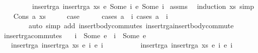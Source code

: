 \begin{isabellebody}
\ \ \ \ \ \ \ \ \ insert{\isacharunderscore}rga\ {\isacharparenleft}insert{\isacharunderscore}rga\ xs\ {\isacharparenleft}e{}{\isacharcomma}\ Some\ i{}{\isacharparenright}{\isacharparenright}\ {\isacharparenleft}e{}{\isacharcomma}\ Some\ i{}{\isacharparenright}{\isachardoublequoteclose}\isanewline
%
\isadelimproof
%
\endisadelimproof
%
\isatagproof
{}\isamarkupfalse%
\ assms\ \isamarkupfalse%
\ {\isacharparenleft}induction\ xs{\isacharcomma}\ simp{\isacharparenright}\isanewline
\ \ \isamarkupfalse%
\ {\isacharparenleft}Cons\ a\ xs{\isacharparenright}\isanewline
\ \ \isamarkupfalse%
\ \isamarkupfalse%
\ {\isacharquery}case\isanewline
\ \ \ \ \isamarkupfalse%
\ {\isacharparenleft}cases\ {\isachardoublequoteopen}a\ {\isacharequal}\ i{}{\isachardoublequoteclose}{\isacharsemicolon}\ cases\ {\isachardoublequoteopen}a\ {\isacharequal}\ i{}{\isachardoublequoteclose}{\isacharsemicolon}\isanewline
\ \ \ \ \ \ \ \ auto\ simp\ add{\isacharcolon}\ insert{\isacharunderscore}body{\isacharunderscore}commutes\ insert{\isacharunderscore}rga{\isacharunderscore}insert{\isacharunderscore}body{\isacharunderscore}commute{\isacharparenright}\isanewline
{}\isamarkupfalse%
%
\endisatagproof
{\isafoldproof}%
%
\isadelimproof
\isanewline
%
\endisadelimproof
\isanewline
{}\isamarkupfalse%
\ insert{\isacharunderscore}rga{\isacharunderscore}commutes{\isacharcolon}\isanewline
\ \ \ {\isachardoublequoteopen}i{}\ {\isasymnoteq}\ Some\ e{}{\isachardoublequoteclose}\ \ {\isachardoublequoteopen}i{}\ {\isasymnoteq}\ Some\ e{}{\isachardoublequoteclose}\isanewline
\ \ \ {\isachardoublequoteopen}insert{\isacharunderscore}rga\ {\isacharparenleft}insert{\isacharunderscore}rga\ xs\ {\isacharparenleft}e{}{\isacharcomma}\ i{}{\isacharparenright}{\isacharparenright}\ {\isacharparenleft}e{}{\isacharcomma}\ i{}{\isacharparenright}\ {\isacharequal}\isanewline
\ \ \ \ \ \ \ \ \ insert{\isacharunderscore}rga\ {\isacharparenleft}insert{\isacharunderscore}rga\ xs\ {\isacharparenleft}e{}{\isacharcomma}\ i{}{\isacharparenright}{\isacharparenright}\ {\isacharparenleft}e{}{\isacharcomma}\ i{}{\isacharparenright}{\isachardoublequoteclose}\isanewline
%
\isadelimproof
%
\endisadelimproof
%
\isatagproof
{}\isamarkupfalse%

\end{isabellebody}
